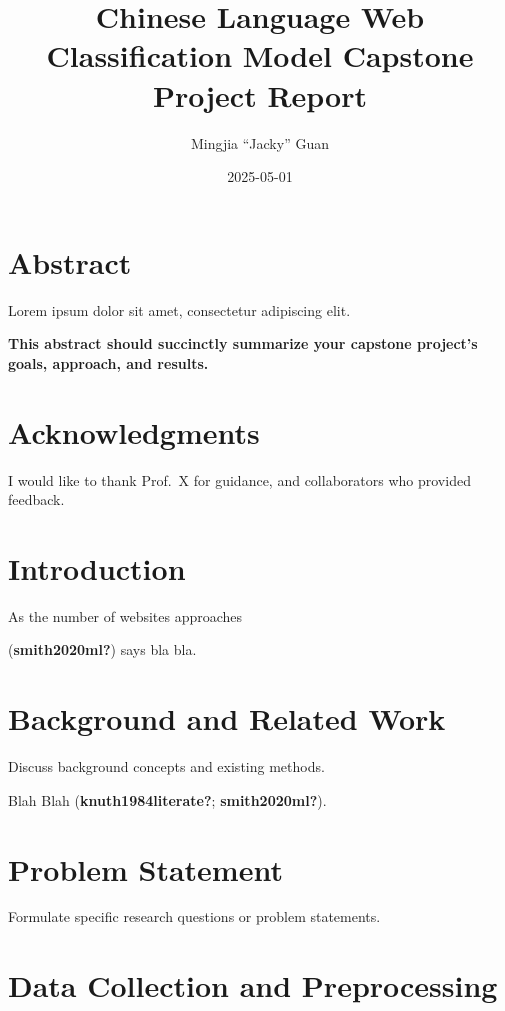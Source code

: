 \documentclass[
  titlepage]{article}
\title{Chinese Language Web Classification Model Capstone Project
Report}
\author{Mingjia ``Jacky'' Guan}
\date{2025-05-01}
\renewcommand*\contentsname{Table of contents}
\newcommand\contentsname{Table of contents}
\begin{document}
\maketitle

\renewcommand*\contentsname{Table of contents}
{
\hypersetup{linkcolor=}
\setcounter{tocdepth}{3}
\tableofcontents
}
\listoffigures
\listoftables

\section*{Abstract}\label{abstract}

Lorem ipsum dolor sit amet, consectetur adipiscing elit.

\textbf{This abstract should succinctly summarize your capstone
project's goals, approach, and results.}

\section*{Acknowledgments}\label{acknowledgments}

I would like to thank Prof.~X for guidance, and collaborators who
provided feedback.

\section{Introduction}\label{introduction}

As the number of websites approaches

(\textbf{smith2020ml?}) says bla bla.

\section{Background and Related Work}\label{background-and-related-work}

Discuss background concepts and existing methods.

Blah Blah (\textbf{knuth1984literate?}; \textbf{smith2020ml?}).

\section{Problem Statement}\label{problem-statement}

Formulate specific research questions or problem statements.

\section{Data Collection and
Preprocessing}\label{data-collection-and-preprocessing}
\end{document}
